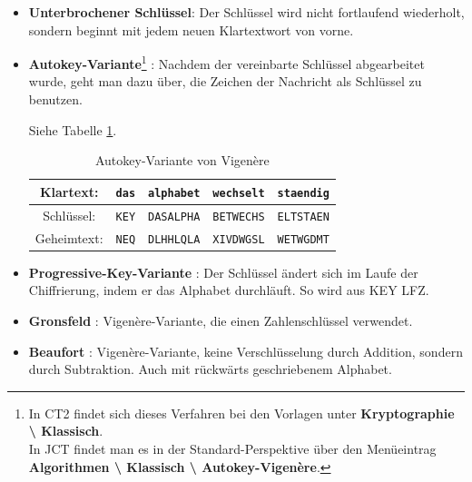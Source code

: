 \begin{refsegment}
\begin{itemize}
\begin{itemize}
   \item {\bf Unterbrochener Schlüssel}:
     Der Schlüssel wird nicht fortlaufend wiederholt, sondern beginnt mit
     jedem neuen Klartextwort von vorne.



   \item {\bf Autokey-Variante}\footnote{%
   In CT2 findet sich dieses Verfahren bei den Vorlagen
   unter {\bf Kryptographie \textbackslash{} Klassisch}.\\
   In JCT findet man es in der Standard-Perspektive
   über den Menüeintrag {\bf Algorithmen \textbackslash{} Klassisch
   \textbackslash{} Autokey-Vigen\`ere}.
   } \cite{Savard1999}:
      Nachdem der vereinbarte Schlüssel abgearbeitet wurde, geht man dazu
      über, die Zeichen der Nachricht als Schlüssel zu benutzen.

      Siehe Tabelle \ref{Autokey-table-reference}.

   \begin{table}[ht]
   \begin{center}
   \begin{tabular}{|c|c|c|c|c|}
   \hline
   Klartext:   & {\tt das} & {\tt alphabet} & {\tt wechselt} & {\tt staendig}\\
   \hline
   Schlüssel: & {\tt KEY} & {\tt DASALPHA} & {\tt BETWECHS} & {\tt ELTSTAEN}\\
   \hline
   Geheimtext: & {\tt NEQ} & {\tt DLHHLQLA} & {\tt XIVDWGSL} & {\tt WETWGDMT}\\
   \hline
   \end{tabular}
   \caption{Autokey-Variante von Vigen\`ere}
   \label{Autokey-table-reference}	
   \end{center}
   \end{table}  %


   \item {\bf Progressive-Key-Variante} \cite{Savard1999}:
      Der Schlüssel ändert sich im Laufe der Chiffrierung, indem er das
      Alphabet durchläuft. So wird aus KEY LFZ.

   \item {\bf Gronsfeld} \cite{Savard1999}:
      Vigen\`ere-Variante, die einen Zahlenschlüssel verwendet.

   \item {\bf Beaufort} \cite{Savard1999}:
      Vigen\`ere-Variante, keine Verschlüsselung durch Addition, sondern durch
      Subtraktion. Auch mit rückwärts geschriebenem Alphabet.


\end{itemize}
\end{itemize}
\end{refsegment}
